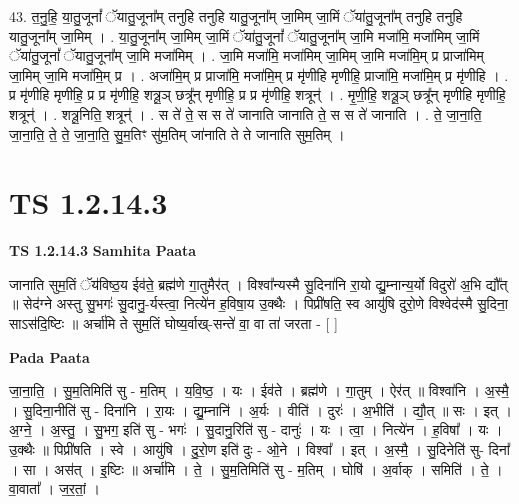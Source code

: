 \documentclass[17pt]{extarticle}
\begin{document}
43. त॒नु॒हि॒ या॒तु॒जूनां᳚ ॅयातु॒जूना᳚म् तनुहि तनुहि यातु॒जूना᳚म् जा॒मिम् जा॒मिं ॅया॑तु॒जूना᳚म् तनुहि तनुहि यातु॒जूना᳚म् जा॒मिम् । . या॒तु॒जूना᳚म् जा॒मिम् जा॒मिं ॅया॑तु॒जूनां᳚ ॅयातु॒जूना᳚म् जा॒मि मजा॑मि॒ मजा॑मिम् जा॒मिं ॅया॑तु॒जूनां᳚ ॅयातु॒जूना᳚म् जा॒मि मजा॑मिम् । . जा॒मि मजा॑मि॒ मजा॑मिम् जा॒मिम् जा॒मि मजा॑मि॒म् प्र प्राजा॑मिम् जा॒मिम् जा॒मि मजा॑मि॒म् प्र । . अजा॑मि॒म् प्र प्राजा॑मि॒ मजा॑मि॒म् प्र मृ॑णीहि मृणीहि॒ प्राजा॑मि॒ मजा॑मि॒म् प्र मृ॑णीहि । . प्र मृ॑णीहि मृणीहि॒ प्र प्र मृ॑णीहि॒ शत्रू॒ञ् छत्रू᳚न् मृणीहि॒ प्र प्र मृ॑णीहि॒ शत्रून्॑ । . मृ॒णी॒हि॒ शत्रू॒ञ् छत्रू᳚न् मृणीहि मृणीहि॒ शत्रून्॑ । . शत्रू॒निति॒ शत्रून्॑ । . स ते॑ ते॒ स स ते॑ जानाति जानाति ते॒ स स ते॑ जानाति । . ते॒ जा॒ना॒ति॒ जा॒ना॒ति॒ ते॒ ते॒ जा॒ना॒ति॒ सु॒म॒तिꣳ सु॑म॒तिम् जा॑नाति ते ते जानाति सुम॒तिम् । \newline
\pagebreak
{}
\section*{ TS 1.2.14.3 }

\textbf{TS 1.2.14.3 } \newline
\textbf{Samhita Paata} \newline

जानाति सुम॒तिं ॅय॑विष्ठ॒य ईव॑ते॒ ब्रह्म॑णे गा॒तुमैर॑त् । विश्वा᳚न्यस्मै सु॒दिना॑नि रा॒यो द्यु॒म्नान्य॒र्यो विदुरो॑ अ॒भि द्यौ᳚त् ॥ सेद॑ग्ने अस्तु सु॒भगः॑ सु॒दानु॒-र्यस्त्वा॒ नित्ये॑न ह॒विषा॒य उ॒क्थैः । पिप्री॑षति॒ स्व आयु॑षि दुरो॒णे विश्वेद॑स्मै सु॒दिना॒ साऽस॑दि॒ष्टिः ॥ अर्चा॑मि ते सुम॒तिं घोष्य॒र्वाख्-सन्ते॑ वा॒ वा ता॑ जरता - [ ] \newline

\textbf{Pada Paata} \newline

जा॒ना॒ति॒ । सु॒म॒तिमिति॑ सु - म॒तिम् । य॒वि॒ष्ठ॒ । यः । ईव॑ते । ब्रह्म॑णे । गा॒तुम् । ऐर॑त् ॥ विश्वा॑नि । अ॒स्मै॒ । सु॒दिना॒नीति॑ सु - दिना॑नि । रा॒यः । द्यु॒म्नानि॑ । अ॒र्यः । वीति॑ । दुरः॑ । अ॒भीति॑ । द्यौ॒त् ॥ सः । इत् । अ॒ग्ने॒ । अ॒स्तु॒ । सु॒भग॒ इति॑ सु - भगः॑ । सु॒दानु॒रिति॑ सु - दानुः॑ । यः । त्वा॒ । नित्ये॑न । ह॒विषा᳚ । यः । उ॒क्थैः ॥ पिप्री॑षति । स्वे । आयु॑षि । दु॒रो॒ण इति॑ दुः - ओ॒ने । विश्वा᳚ । इत् । अ॒स्मै॒ । सु॒दिनेति॑ सु- दिना᳚ । सा । अस॑त् । इ॒ष्टिः ॥ अर्चा॑मि । ते॒ । सु॒म॒तिमिति॑ सु - म॒तिम् । घोषि॑ । अ॒र्वाक् । समिति॑ । ते॒ । वा॒वाता᳚ । ज॒र॒तां॒ ।  \newline
\end{document}
